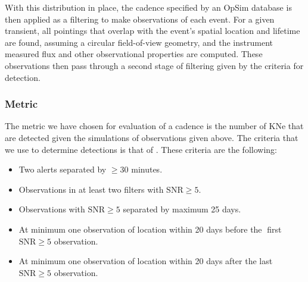 With this distribution in place, the cadence specified by an OpSim database is then applied as a filtering to make observations of each event. For a given transient, all pointings that overlap with the event's spatial location and lifetime are found, assuming a circular field-of-view geometry, and the instrument measured flux and other observational properties are computed. These observations then pass through a second stage of filtering given by the criteria for detection.\par

\subsubsection{Metric}
The metric we have chosen for evaluation of a cadence is the number of KNe that are detected given the simulations of observations given above. The criteria that we use to determine detections is that of \citep{Scolnic2017a}. These criteria are the following:
\begin{itemize}
  \item Two alerts separated by $\geq 30$ minutes.
  \item Observations in at least two filters with $\mathrm{SNR} \geq 5$.
  \item Observations with $\mathrm{SNR} \geq 5$ separated by maximum 25 days.
  \item At minimum one observation of location within 20 days before the first $\mathrm{SNR} \geq 5$ observation.
  \item At minimum one observation of location within 20 days after the last $\mathrm{SNR} \geq 5$ observation.
\end{itemize}

